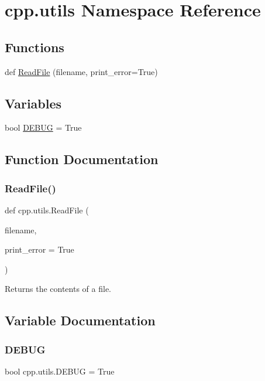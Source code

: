 \hypertarget{namespacecpp_1_1utils}{}\section{cpp.\+utils Namespace Reference}
\label{namespacecpp_1_1utils}
\subsection*{Functions}
\begin{DoxyCompactItemize}
\item 
def \hyperlink{namespacecpp_1_1utils_a4258aa53673d101d6f57320ec9a3c3a2}{Read\+File} (filename, print\+\_\+error=True)
\end{DoxyCompactItemize}
\subsection*{Variables}
\begin{DoxyCompactItemize}
\item 
bool \hyperlink{namespacecpp_1_1utils_aa59cfd61e9b0495b717753e45fe9d201}{D\+E\+B\+UG} = True
\end{DoxyCompactItemize}


\subsection{Function Documentation}
\mbox{\label{namespacecpp_1_1utils_a4258aa53673d101d6f57320ec9a3c3a2}} 
\subsubsection{\texorpdfstring{Read\+File()}{ReadFile()}}
{\footnotesize\ttfamily def cpp.\+utils.\+Read\+File (\begin{DoxyParamCaption}\item[{}]{filename,  }\item[{}]{print\+\_\+error = {\ttfamily True} }\end{DoxyParamCaption})}

\begin{DoxyVerb}Returns the contents of a file.\end{DoxyVerb}
 

\subsection{Variable Documentation}
\mbox{\label{namespacecpp_1_1utils_aa59cfd61e9b0495b717753e45fe9d201}} 
\subsubsection{\texorpdfstring{D\+E\+B\+UG}{DEBUG}}
{\footnotesize\ttfamily bool cpp.\+utils.\+D\+E\+B\+UG = True}

